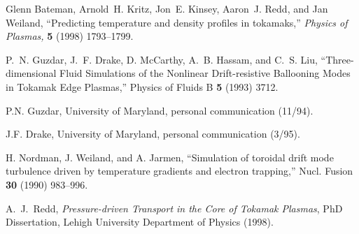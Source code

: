 
\begin{thebibliography}{99}

Glenn Bateman, Arnold~H. Kritz, Jon~E. Kinsey, Aaron~J. Redd, and Jan Weiland,
``Predicting temperature and density profiles in tokamaks,''
{\em Physics of Plasmas,} {\bf 5} (1998) 1793--1799.

P.~N. Guzdar, J.~F. Drake, D. McCarthy, A.~B. Hassam, and C.~S. Liu,
``Three-dimensional Fluid Simulations of the Nonlinear Drift-resistive
Ballooning Modes in Tokamak Edge Plasmas,'' Physics of Fluids B {\bf 5}
(1993) 3712.

 P.N. Guzdar, University of Maryland, personal communication
 (11/94).


 J.F. Drake, University of Maryland, personal
communication (3/95).


 H. Nordman, J. Weiland, and A. Jarmen, 
``Simulation of toroidal drift mode turbulence driven by 
temperature gradients and electron trapping,'' 
Nucl. Fusion {\bf 30} (1990) 983--996.



 A.~J.~Redd,
{\it Pressure-driven Transport in the Core of Tokamak Plasmas},
PhD Dissertation, Lehigh University Department of Physics (1998).

\end{thebibliography}

